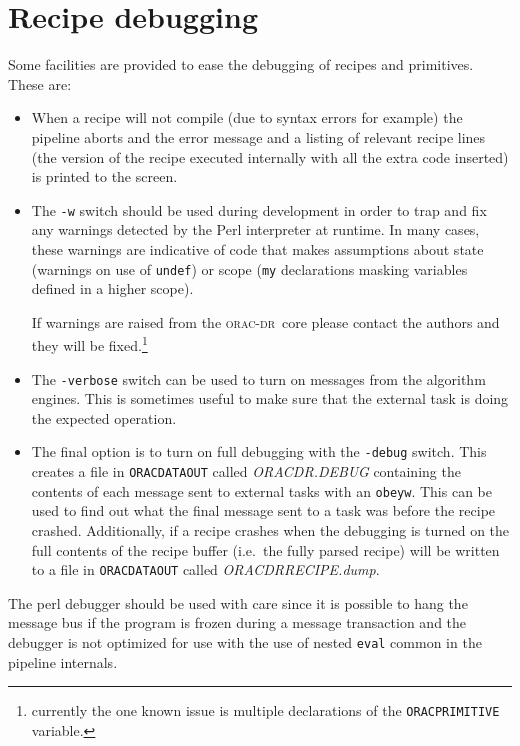 \documentclass[twoside,11pt]{article}
\renewcommand{\_}{\texttt{\symbol{95}}}
\newcommand{\Oracdr}{\textsc{orac-dr}}
\begin{document}
\section{Recipe debugging}

Some facilities are provided to ease the debugging of recipes and
primitives. These are:

\begin{itemize}

\item When a recipe will not compile (due to syntax errors for
example) the pipeline aborts and the error message and a listing of
relevant recipe lines (the version of the recipe executed internally
with all the extra code inserted) is printed to the screen.

\item The \texttt{-w} switch should be used during development 
in order to trap and fix any warnings detected by the Perl interpreter
at runtime. In many cases, these warnings are indicative of code that
makes assumptions about state (warnings on use of \texttt{undef}) or
scope (\texttt{my} declarations masking variables defined in a higher
scope). 

If warnings are raised from the \Oracdr\ core please contact the
authors and they will be fixed.\footnote{currently the one known issue 
is multiple declarations of the \texttt{ORAC\_PRIMITIVE} variable.}

\item The \texttt{-verbose} switch can be used to turn on messages from 
the algorithm engines. This is sometimes useful to make sure that the
external task is doing the expected operation.

\item The final option is to turn on full debugging with the
\texttt{-debug} switch. This creates a file in
\texttt{ORAC\_DATA\_OUT} called \textit{ORACDR.DEBUG} containing the
contents of each message sent to external tasks with an
\texttt{obeyw}. This can be used to find out what the final message
sent to a task was before the recipe crashed. Additionally, if a
recipe crashes when the debugging is turned on the full contents of
the recipe buffer (i.e.\ the fully parsed recipe) will be written 
to a file in \texttt{ORAC\_DATA\_OUT} called
\textit{ORACDR\_RECIPE.dump}.

\end{itemize}

The perl debugger should be used with care since it is possible to
hang the message bus if the program is frozen during a message
transaction and the debugger is not optimized for use with the use of nested
\texttt{eval} common in the pipeline internals.
\end{document}
